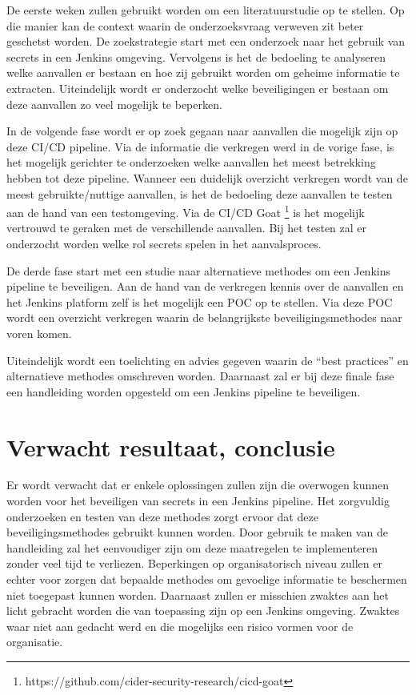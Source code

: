 De eerste weken zullen gebruikt worden om een literatuurstudie op te stellen. Op die manier kan de context waarin de onderzoeksvraag verweven zit beter geschetst worden. De zoekstrategie start met een onderzoek naar het gebruik van secrets in een Jenkins omgeving. Vervolgens is het de bedoeling te analyseren welke aanvallen er bestaan en hoe zij gebruikt worden om geheime informatie te extracten. Uiteindelijk wordt er onderzocht welke beveiligingen er bestaan om deze aanvallen zo veel mogelijk te beperken.

In de volgende fase wordt er op zoek gegaan naar aanvallen die mogelijk zijn op deze CI/CD pipeline. Via de informatie die verkregen werd in de vorige fase, is het mogelijk gerichter te onderzoeken welke aanvallen het meest betrekking hebben tot deze pipeline.  Wanneer een duidelijk overzicht verkregen wordt van de meest gebruikte/nuttige aanvallen, is het de bedoeling deze aanvallen te testen aan de hand van een testomgeving. Via de CI/CD Goat \footnote{https://github.com/cider-security-research/cicd-goat} is het mogelijk vertrouwd te geraken met de verschillende aanvallen. Bij het testen zal er onderzocht worden welke rol secrets spelen in het aanvalsproces.  

De derde fase start met een studie naar alternatieve methodes om  een Jenkins pipeline te beveiligen. Aan de hand van de verkregen kennis over de aanvallen en het Jenkins platform zelf is het mogelijk een POC op te stellen. Via deze POC wordt een overzicht verkregen waarin de belangrijkste beveiligingsmethodes naar voren komen.

Uiteindelijk wordt een toelichting en advies gegeven waarin de “best practices” en alternatieve methodes omschreven worden. Daarnaast zal er bij deze finale fase een handleiding worden opgesteld om een Jenkins pipeline te beveiligen.


\section{Verwacht resultaat, conclusie}%
\label{sec:verwachte_resultaten}

Er wordt verwacht dat er enkele oplossingen zullen zijn die overwogen kunnen worden voor het beveiligen van secrets in een Jenkins pipeline. Het zorgvuldig onderzoeken en testen van deze methodes zorgt ervoor dat deze beveiligingsmethodes gebruikt kunnen worden. Door gebruik te maken van de handleiding zal het eenvoudiger zijn om deze maatregelen te implementeren zonder veel tijd te verliezen. Beperkingen op organisatorisch niveau zullen er echter voor zorgen dat bepaalde methodes om gevoelige informatie te beschermen niet toegepast kunnen worden. Daarnaast zullen er misschien zwaktes aan het licht gebracht worden die van toepassing zijn op een Jenkins omgeving. Zwaktes waar niet aan gedacht werd en die mogelijks een risico vormen voor de organisatie. 
